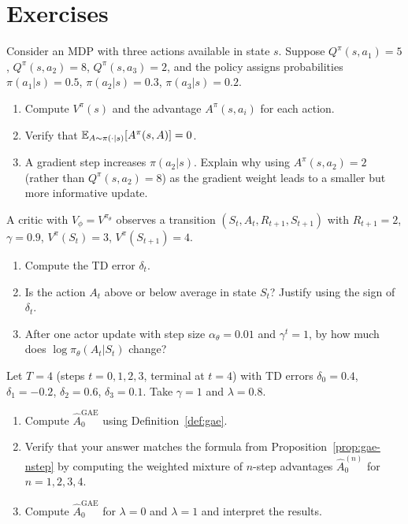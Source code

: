 \section*{Exercises}
\label{sec:ch9-exercises}

\begin{exercise}
\label{ex:advantage-computation}
Consider an MDP with three actions available in state $s$.
Suppose $Q^{\pi}(s, a_1) = 5$, $Q^{\pi}(s, a_2) = 8$, $Q^{\pi}(s, a_3) = 2$,
and the policy assigns probabilities $\pi(a_1|s) = 0.5$, $\pi(a_2|s) = 0.3$,
$\pi(a_3|s) = 0.2$.
\begin{enumerate}[label=(\alph*)]
  \item Compute $V^\pi(s)$ and the advantage $A^\pi(s, a_i)$ for each action.
  \item Verify that $\operatorname{\mathbb{E}}_{A \sim \pi(\cdot|s)}[A^\pi(s,A)] = 0$.
  \item A gradient step increases $\pi(a_2|s)$.  Explain why using
    $A^\pi(s,a_2) = 2$ (rather than $Q^\pi(s,a_2) = 8$) as the gradient
    weight leads to a smaller but more informative update.
\end{enumerate}
\end{exercise}

\begin{exercise}
\label{ex:td-advantage-numeric}
A critic with $V_\phi = V^{\pi_\theta}$ observes a transition
$(S_t, A_t, R_{t+1}, S_{t+1})$ with $R_{t+1} = 2$, $\gamma = 0.9$,
$V^\pi(S_t) = 3$, $V^\pi(S_{t+1}) = 4$.
\begin{enumerate}[label=(\alph*)]
  \item Compute the TD error $\delta_t$.
  \item Is the action $A_t$ above or below average in state $S_t$?
    Justify using the sign of $\delta_t$.
  \item After one actor update with step size $\alpha_\theta = 0.01$
    and $\gamma^t = 1$, by how much does
    $\log \pi_\theta(A_t|S_t)$ change?
\end{enumerate}
\end{exercise}

\begin{exercise}
\label{ex:gae-derivation}
Let $T = 4$ (steps $t = 0,1,2,3$, terminal at $t=4$) with TD errors
$\delta_0 = 0.4$, $\delta_1 = -0.2$, $\delta_2 = 0.6$, $\delta_3 = 0.1$.
Take $\gamma = 1$ and $\lambda = 0.8$.
\begin{enumerate}[label=(\alph*)]
  \item Compute $\hat{A}_0^{\mathrm{GAE}}$ using Definition~\ref{def:gae}.
  \item Verify that your answer matches the formula from
    Proposition~\ref{prop:gae-nstep} by computing the weighted mixture of
    $n$-step advantages $\hat{A}_0^{(n)}$ for $n = 1, 2, 3, 4$.
  \item Compute $\hat{A}_0^{\mathrm{GAE}}$ for $\lambda = 0$ and
    $\lambda = 1$ and interpret the results.
\end{enumerate}
\end{exercise}

